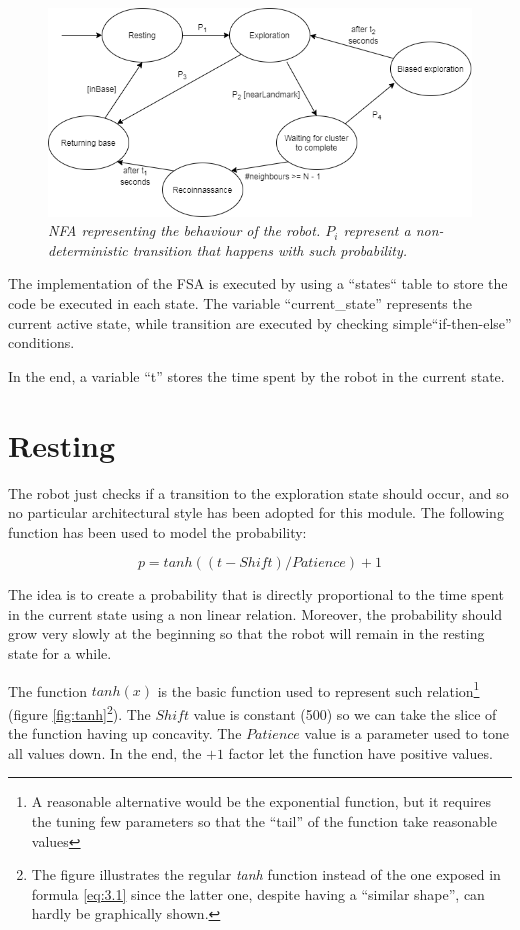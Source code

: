 \begin{figure}[H]
\centering
\includegraphics[width=\linewidth]{images/NFA.png}
\caption{\textit{NFA representing the behaviour of the robot. $P_i$ represent a non-deterministic transition that happens with such probability.}}
\label{fig:NFA}
\end{figure}

The implementation of the FSA is executed by using a ``states`` table to store the code be executed in each state. The variable ``current\_state'' represents the current active state, while transition are executed by checking simple``if-then-else'' conditions.

\noindent
In the end, a variable ``t'' stores the time spent by the robot in the current state.

\section{Resting}

The robot just checks if a transition to the exploration state should occur, and so no particular architectural style has been adopted for this module. The following function has been used to model the probability:

\begin{equation}
    p = tanh((t - Shift) / Patience) + 1 \tag{3.1}\label{eq:3.1}
\end{equation}

\noindent
The idea is to create a probability that is directly proportional to the time spent in the current state using a non linear relation. Moreover, the probability should grow very slowly at the beginning so that the robot will remain in the resting state for a while. 

\noindent
The function $tanh(x)$ is the basic function used to represent such relation\footnote{A reasonable alternative would be the exponential function, but it requires the tuning few parameters so that the ``tail'' of the function take reasonable values} (figure \ref{fig:tanh}\footnote{The figure illustrates the regular \textit{tanh} function instead of the one exposed in formula \ref{eq:3.1} since the latter one, despite having a ``similar shape'', can hardly be graphically shown.}). The $Shift$ value is constant (500) so we can take the slice of the function having up concavity. The $Patience$ value is a parameter used to tone all values down. In the end, the $+1$ factor let the function have positive values.  

